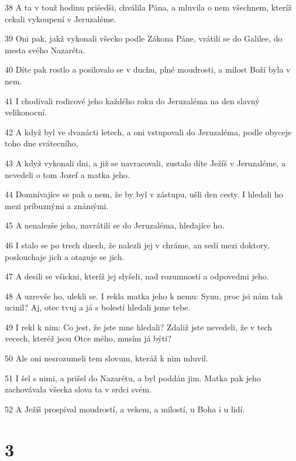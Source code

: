 \par 38 A ta v touž hodinu prišedši, chválila Pána, a mluvila o nem všechnem, kteríž cekali vykoupení v Jeruzaléme.
\par 39 Oni pak, jakž vykonali všecko podle Zákona Páne, vrátili se do Galilee, do mesta svého Nazaréta.
\par 40 Díte pak rostlo a posilovalo se v duchu, plné moudrosti, a milost Boží byla v nem.
\par 41 I chodívali rodicové jeho každého roku do Jeruzaléma na den slavný velikonocní.
\par 42 A když byl ve dvanácti letech, a oni vstupovali do Jeruzaléma, podle obyceje toho dne svátecního,
\par 43 A když vykonali dni, a již se navracovali, zustalo díte Ježíš v Jeruzaléme, a nevedeli o tom Jozef a matka jeho.
\par 44 Domnívajíce se pak o nem, že by byl v zástupu, ušli den cesty. I hledali ho mezi príbuznými a známými.
\par 45 A nenalezše jeho, navrátili se do Jeruzaléma, hledajíce ho.
\par 46 I stalo se po trech dnech, že nalezli jej v chráme, an sedí mezi doktory, poslouchaje jich a otazuje se jich.
\par 47 A desili se všickni, kteríž jej slyšeli, nad rozumností a odpovedmi jeho.
\par 48 A uzrevše ho, ulekli se. I rekla matka jeho k nemu: Synu, proc jsi nám tak ucinil? Aj, otec tvuj a já s bolestí hledali jsme tebe.
\par 49 I rekl k nim: Co jest, že jste mne hledali? Zdaliž jste nevedeli, že v tech vecech, kteréž jsou Otce mého, musím já býti?
\par 50 Ale oni nesrozumeli tem slovum, kteráž k nim mluvil.
\par 51 I šel s nimi, a prišel do Nazarétu, a byl poddán jim. Matka pak jeho zachovávala všecka slova ta v srdci svém.
\par 52 A Ježíš prospíval moudrostí, a vekem, a milostí, u Boha i u lidí.

\chapter{3}

